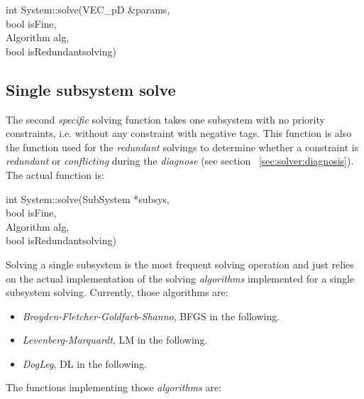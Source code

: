 \documentclass[12pt,twoside,a4paper]{book}
\begin{document}
    \begin{codequote}
    int System::solve(VEC\_pD \&params,\\
    \-\hspace{3cm}bool isFine,\\
    \-\hspace{3cm}Algorithm alg,\\
    \-\hspace{3cm}bool isRedundantsolving)
    \end{codequote}

    \subsection{Single subsystem solve}

    The second \emph{specific} solving function takes one subsystem with no priority constraints, i.e. without any constraint with negative tags. This function is also the function used for the \emph{redundant} solvings to determine whether a constraint is \emph{redundant} or \emph{conflicting} during the \emph{diagnose} (see section ~\ref{sec:solver:diagnosis}). The actual function is:

    \begin{codequote}
    int System::solve(SubSystem *subsys,\\
    \-\hspace{3cm}bool isFine,\\
    \-\hspace{3cm}Algorithm alg,\\
    \-\hspace{3cm}bool isRedundantsolving)
    \end{codequote}

    Solving a single subsystem is the most frequent solving operation and just relies on the actual implementation of the solving \emph{algorithms} implemented for a single subsystem solving. Currently, those algorithms are:

    \begin{itemize}
     \item \emph{Broyden-Fletcher-Goldfarb-Shanno}, BFGS in the following.
     \item \emph{Levenberg-Marquardt}, LM in the following.
     \item \emph{DogLeg}, DL in the following.
    \end{itemize}


    The functions implementing those \emph{algorithms} are:
\end{document}
